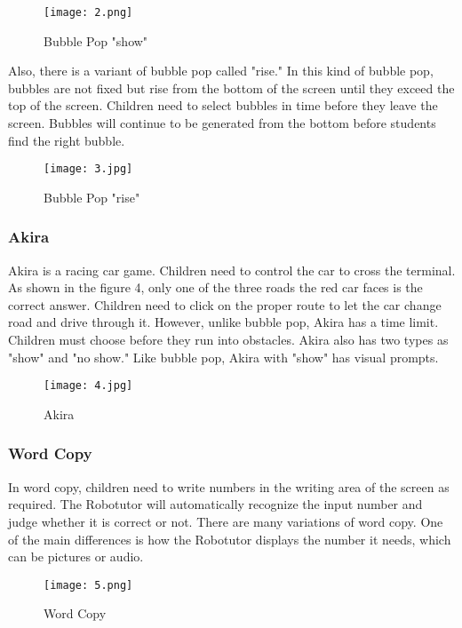 \documentclass[hyperref]{ctexart}
\begin{document}
\begin{multicols}{2}
    \begin{figure}[H]
    \small
    \centering
    \texttt{[image: 2.png]}
    \caption{Bubble Pop "show"} \label{fig:aa}
    \end{figure}
    
    Also, there is a variant of bubble pop called "rise." In this kind of bubble pop, bubbles are not fixed but rise from the bottom of the screen until they exceed the top of the screen. Children need to select bubbles in time before they leave the screen. Bubbles will continue to be generated from the bottom before students find the right bubble.
    \begin{figure}[H]
    \small
    \centering
    \texttt{[image: 3.jpg]}
    \caption{Bubble Pop "rise"} \label{fig:aa}
    \end{figure}
    
    \subsubsection{Akira}
    Akira is a racing car game. Children need to control the car to cross the terminal. As shown in the figure 4, only one of the three roads the red car faces is the correct answer. Children need to click on the proper route to let the car change road and drive through it. However, unlike bubble pop, Akira has a time limit. Children must choose before they run into obstacles. Akira also has two types as "show" and "no show." Like bubble pop, Akira with "show" has visual prompts.
    \begin{figure}[H]
    \small
    \centering
    \texttt{[image: 4.jpg]}
    \caption{Akira} \label{fig:aa}
    \end{figure}
    
    \subsubsection{Word Copy}
    In word copy, children need to write numbers in the writing area of the screen as required. The Robotutor will automatically recognize the input number and judge whether it is correct or not. There are many variations of word copy. One of the main differences is how the Robotutor displays the number it needs, which can be pictures or audio.
    \begin{figure}[H]
    \small
    \centering
    \texttt{[image: 5.png]}
    \caption{Word Copy} \label{fig:aa}
    \end{figure}
    

\end{multicols}
\end{document}

